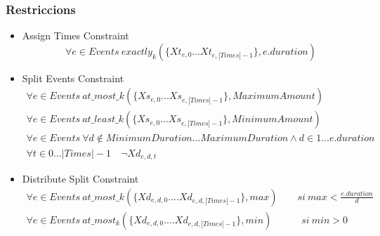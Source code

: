 \documentclass[8pt]{beamer}
\begin{document}
  
  \begin{frame}
    \frametitle{Restriccions}

    \begin{itemize}
      \item Assign Times Constraint \[
        \forall e \in Events \ exactly_k(\{Xt_{e,0} ... Xt_{e,|Times|-1}\}, e.duration)
      \]
      \item Split Events Constraint
      \begin{gather*}
        \forall e \in Events \ at\_most\_k(\{Xs_{e,0} . . . Xs_{e,|Times|-1}\}, MaximumAmount)\\
        \forall e \in Events \ at\_least\_k(\{Xs_{e,0} . . . Xs_{e,|Times|-1}\}, MinimumAmount)\\
        \forall e \in Events \ \forall d \notin MinimumDuration...MaximumDuration \land d \in 1 ... e.duration  \\
        \forall t \in 0...|Times|-1 \quad \neg Xd_{e,d,t}
      \end{gather*}
      \item Distribute Split Constraint
      \begin{gather*}
      \forall e \in Events \ at\_most\_k(\{Xd_{e,d,0} .... Xd_{e,d,|Times|-1}\}, max) \quad \quad si \ max<\frac{e.duration}{d}\\
      \forall e \in Events \ at\_most_k(\{Xd_{e,d,0} .... Xd_{e,d,|Times|-1}\}, min) \quad \quad \quad si \ min>0\\
      \end{gather*}
    \end{itemize}
  
  \end{frame} 
\end{document}
